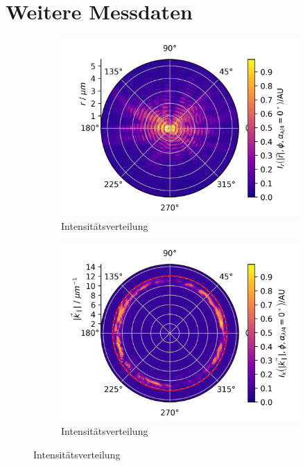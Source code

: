 \documentclass[a4paper, titlepage,  ngerman]{book}
\begin{document}
	\chapter{Weitere Messdaten}
	\begin{figure}[H]		
		\centering
		\begin{subfigure}{0.49\textwidth}
			\centering
			\includegraphics[width=\textwidth]{figures/new/B_1_fp_0.png}
			\caption{Intensitätsverteilung}
			\label{fig:dirt_polar_fp}
		\end{subfigure}
		\begin{subfigure}{0.5\textwidth}
			\centering
			\includegraphics[width=\textwidth]{figures/new/B_1_bfp_90.png}
			\caption{Intensitätsverteilung}
			\label{fig:dirt_polar}

\end{subfigure}
\end{figure}
\end{document}
